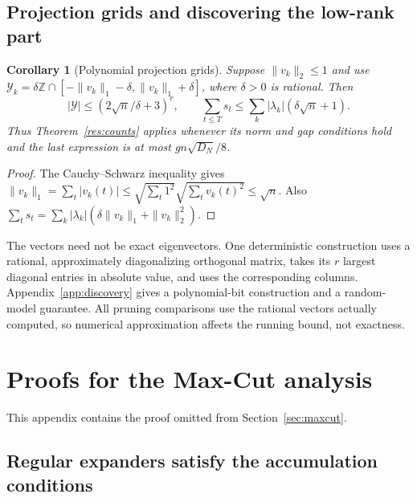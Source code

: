 \documentclass[11pt,a4paper]{article}
\newtheorem{corollary}[theorem]{Corollary}
\theoremstyle{definition}
\theoremstyle{remark}
\begin{document}
\subsection{Projection grids and discovering the low-rank part}

\begin{corollary}[Polynomial projection grids]\label{cor:spectral}
Suppose $\|v_k\|_2\le1$ and use
$\mathcal Y_k=\delta\mathbb Z\cap[-\|v_k\|_1-\delta,\|v_k\|_1+\delta]$,
where $\delta>0$ is rational. Then
\[
 |\mathcal Y|\le(2\sqrt n/\delta+3)^r,\qquad
 \sum_{t\le T}s_t\le\sum_k|\lambda_k|(\delta\sqrt n+1).
\]
Thus Theorem~\ref{res:counts} applies whenever its norm and gap conditions
hold and the last expression is at most $gn\sqrt{D_N}/8$.
\end{corollary}
\begin{proof}
The Cauchy--Schwarz inequality gives
$\|v_k\|_1=\sum_t|v_k(t)|\le\sqrt{\sum_t1^2}\sqrt{\sum_tv_k(t)^2}
\le\sqrt n$. Also
$\sum_ts_t=\sum_k|\lambda_k|(\delta\|v_k\|_1+\|v_k\|_2^2)$.
\end{proof}

The vectors need not be exact eigenvectors. One deterministic construction
uses a rational, approximately diagonalizing orthogonal matrix, takes its
$r$ largest diagonal entries in absolute value, and uses the corresponding
columns. Appendix~\ref{app:discovery} gives a polynomial-bit construction
and a random-model guarantee. All pruning comparisons use the rational
vectors actually computed, so numerical approximation affects the running
bound, not exactness.

\section{Proofs for the Max-Cut analysis}\label{app:maxcut}

This appendix contains the proof omitted from Section~\ref{sec:maxcut}.

\subsection{Regular expanders satisfy the accumulation conditions}\label{app:expander_conditions}
\end{document}
